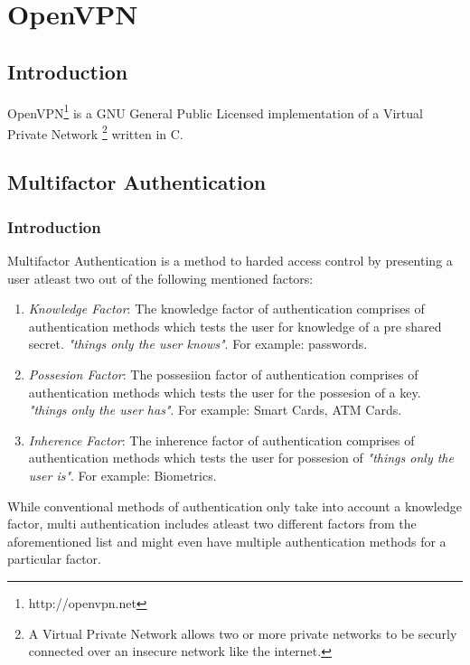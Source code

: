 \documentclass[11pt,oneside]{book}
\begin{document}
\printglossary


\mainmatter

\chapter{OpenVPN}
\section{Introduction}
OpenVPN\footnote{http://openvpn.net} is a GNU General Public Licensed implementation of a
Virtual Private Network \footnote{A Virtual Private Network allows two or more private
networks to be securly connected over an insecure network like the internet.} written
in C.

\section{Multifactor Authentication}
\subsection{Introduction}
Multifactor Authentication is a method to harded access control by presenting a user atleast
two out of the following mentioned factors:

\begin{enumerate}
    \item \emph{Knowledge Factor}: The knowledge factor of authentication comprises of
        authentication methods which tests the user for knowledge of a pre shared secret.
        \emph{"things only the user knows"}. For example: passwords.
    \item \emph{Possesion Factor}: The possesiion factor of authentication comprises of
        authentication methods which tests the user for the possesion of a key.
        \emph{"things only the user has"}. For example: Smart Cards, ATM Cards.
    \item \emph{Inherence Factor}: The inherence factor of authentication comprises of
        authentication methods which tests the user for possesion of \emph{"things only
        the user is"}. For example: Biometrics.
\end{enumerate}

While conventional methods of authentication only take into account a knowledge factor,
multi authentication includes atleast two different factors from the aforementioned list
and might even have multiple authentication methods for a particular factor.
\end{document}
